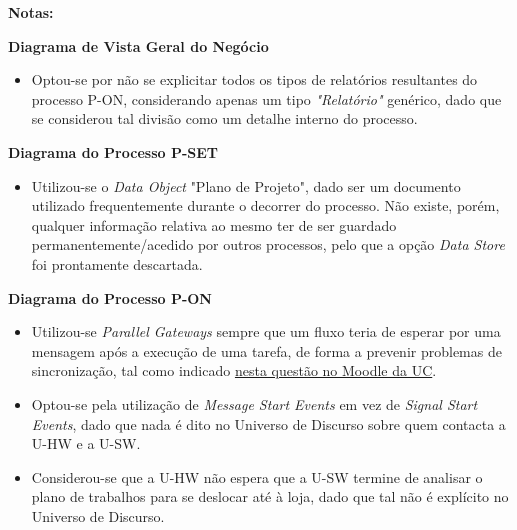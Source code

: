 \documentclass[12pt,a4paper]{article}
\begin{document}
\begin{tcolorbox}[enhanced jigsaw,colback=bg,boxrule=0pt,arc=4pt]
  \begin{large}
    \textbf{Notas:}
  \end{large}

  \begin{small}
    \textbf{Diagrama de Vista Geral do Negócio}
  \end{small}
  \begin{itemize}
    \item Optou-se por não se explicitar todos os tipos de relatórios resultantes do processo P-ON,
          considerando apenas um tipo \textit{"Relatório"} genérico, dado que se considerou tal
          divisão como um detalhe interno do processo.
  \end{itemize}

  \begin{small}
    \textbf{Diagrama do Processo P-SET}
  \end{small}
  \begin{itemize}
    \item Utilizou-se o \textit{Data Object} "Plano de Projeto", dado ser um documento
          utilizado frequentemente durante o decorrer do processo.
          Não existe, porém, qualquer informação relativa ao mesmo ter de ser guardado permanentemente/acedido
          por outros processos, pelo que a opção \textit{Data Store} foi prontamente descartada.
  \end{itemize}

  \begin{small}
    \textbf{Diagrama do Processo P-ON}
  \end{small}
  \begin{itemize}
    \item Utilizou-se \textit{Parallel Gateways} sempre que um fluxo teria de esperar por uma
          mensagem após a execução de uma tarefa, de forma a prevenir problemas de sincronização,
          tal como indicado \href{https://moodle.dei.tecnico.ulisboa.pt/mod/forum/discuss.php?d=7213}{nesta questão no Moodle da UC}.
    \item Optou-se pela utilização de \textit{Message Start Events} em vez de \textit{Signal Start Events}, dado que nada é dito
          no Universo de Discurso sobre quem contacta a U-HW e a U-SW.
    \item Considerou-se que a U-HW não espera que a U-SW termine de analisar o plano
          de trabalhos para se deslocar até à loja, dado que tal não é explícito no Universo de Discurso.
  \end{itemize}
\end{tcolorbox}
\end{document}
